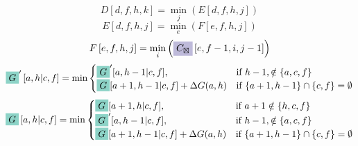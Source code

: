 \documentclass{article}
\begin{document}
$$ D\left[ d,f,h,k \right] =\min_{ j } \left( E\left[d,f,h,j\right]\right) $$
$$ E\left[ d,f,h,j \right] =\min_{ e } \left( F\left[e,f,h,j\right]\right) $$
$$ F\left[ e,f,h,j \right] =\min_{ i } \left( \colorbox{c2}{$C_{\boxtimes}$}\left[e,f-1,i,j-1\right]\right) $$
$$ \colorbox{c0}{$G$}' \left[a,h | c,f \right] =  \min\begin{cases}\colorbox{c0}{$G$}'[ a , h-1|c,f ], &\text{if } h-1 ,\notin\{ a , c,f \} \\\colorbox{c0}{$G$}[ a+1 , h-1|c,f ]+\Delta G(a,h) &\text{if } \{ a+1 , h-1 \}\cap \{ c,f \}=\emptyset\end{cases}$$
$$ \colorbox{c0}{$G$} \left[a,h | c,f \right] =  \min\begin{cases}\colorbox{c0}{$G$}[ a+1 , h|c,f ], &\text{if } a+1 \notin\{ h , c,f \} \\\colorbox{c0}{$G$}'[ a , h-1|c,f ], &\text{if } h-1 ,\notin\{ a , c,f \} \\\colorbox{c0}{$G$}[ a+1 , h-1|c,f ]+\Delta G(a,h) &\text{if } \{ a+1 , h-1 \}\cap \{ c,f \}=\emptyset\end{cases}$$
\end{document}
